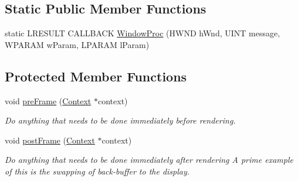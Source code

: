 \subsection*{Static Public Member Functions}
\begin{DoxyCompactItemize}
\item 
static L\+R\+E\+S\+U\+LT C\+A\+L\+L\+B\+A\+CK \hyperlink{class_window_p_c_a135d3ecba5245fd810c2e3e3d9cf8cf9}{Window\+Proc} (H\+W\+ND h\+Wnd, U\+I\+NT message, W\+P\+A\+R\+AM w\+Param, L\+P\+A\+R\+AM l\+Param)
\end{DoxyCompactItemize}
\subsection*{Protected Member Functions}
\begin{DoxyCompactItemize}
\item 
void \hyperlink{class_window_p_c_a50f059f9690a597769035c9d1a81e994}{pre\+Frame} (\hyperlink{class_context}{Context} $\ast$context)
\begin{DoxyCompactList}\small\item\em Do anything that needs to be done immediately before rendering. \end{DoxyCompactList}\item 
void \hyperlink{class_window_p_c_aa910bf9e32d41941f48eec5f2872ee80}{post\+Frame} (\hyperlink{class_context}{Context} $\ast$context)
\begin{DoxyCompactList}\small\item\em Do anything that needs to be done immediately after rendering A prime example of this is the swapping of back-\/buffer to the display. \end{DoxyCompactList}\end{DoxyCompactItemize}
